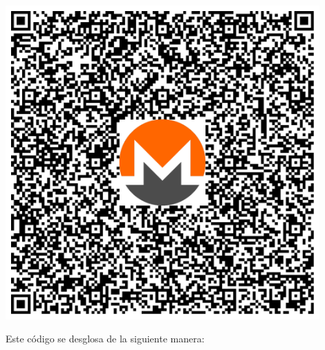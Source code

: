 \documentclass[12pt,a4paper]{article}
\begin{document}
\begin{center}
\includegraphics[width=0.9\textwidth]{media/qr-code3.pdf}
\end{center}

Este código se desglosa de la siguiente manera:
\end{document}
